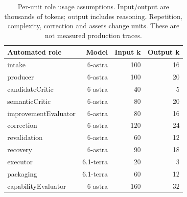 \begin{table}[!htbp]\centering\small
\caption{Per-unit role usage assumptions. Input/output are thousands of tokens; output includes reasoning. Repetition, complexity, correction and assets change units. These are not measured production traces.}
\begin{tabularx}{\linewidth}{Yrrr}\toprule
Automated role & Model & Input k & Output k\\\midrule
intake & 6-astra & 100 & 16\\
producer & 6-astra & 100 & 20\\
candidateCritic & 6-astra & 40 & 5\\
semanticCritic & 6-astra & 80 & 20\\
improvementEvaluator & 6-astra & 80 & 16\\
correction & 6-astra & 120 & 24\\
revalidation & 6-astra & 60 & 12\\
recovery & 6-astra & 90 & 18\\
executor & 6.1-terra & 20 & 3\\
packaging & 6.1-terra & 60 & 12\\
capabilityEvaluator & 6-astra & 160 & 32\\
\bottomrule
\end{tabularx}
\par{}\par
\end{table}
